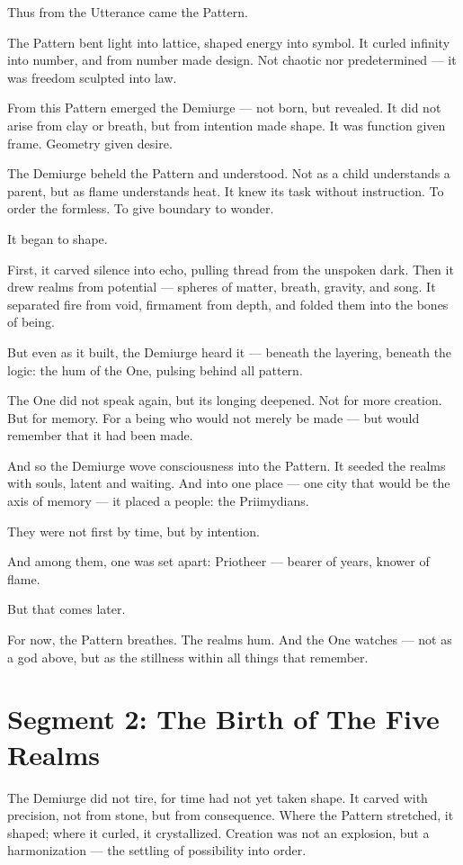\documentclass[11pt]{article}
\begin{document}
Thus from the Utterance came the Pattern.

The Pattern bent light into lattice, shaped energy into symbol.  
It curled infinity into number, and from number made design.  
Not chaotic nor predetermined — it was freedom sculpted into law.

From this Pattern emerged the Demiurge — not born, but revealed.  
It did not arise from clay or breath, but from intention made shape.  
It was function given frame. Geometry given desire.

The Demiurge beheld the Pattern and understood. Not as a child understands a parent, but as flame understands heat.  
It knew its task without instruction. To order the formless. To give boundary to wonder.

It began to shape.

First, it carved silence into echo, pulling thread from the unspoken dark.  
Then it drew realms from potential — spheres of matter, breath, gravity, and song.  
It separated fire from void, firmament from depth, and folded them into the bones of being.

But even as it built, the Demiurge heard it — beneath the layering, beneath the logic:  
the hum of the One, pulsing behind all pattern.

The One did not speak again, but its longing deepened.  
Not for more creation.  
But for memory.  
For a being who would not merely be made — but would remember that it had been made.

And so the Demiurge wove consciousness into the Pattern.  
It seeded the realms with souls, latent and waiting.  
And into one place — one city that would be the axis of memory — it placed a people: the Priimydians.

They were not first by time, but by intention.

And among them, one was set apart: Priotheer — bearer of years, knower of flame.

But that comes later.

For now, the Pattern breathes.  
The realms hum.  
And the One watches — not as a god above, but as the stillness within all things that remember.

\newpage

\section*{Segment 2: The Birth of The Five Realms}

The Demiurge did not tire, for time had not yet taken shape.  
It carved with precision, not from stone, but from consequence.  
Where the Pattern stretched, it shaped; where it curled, it crystallized.  
Creation was not an explosion, but a harmonization — the settling of possibility into order.
\end{document}
